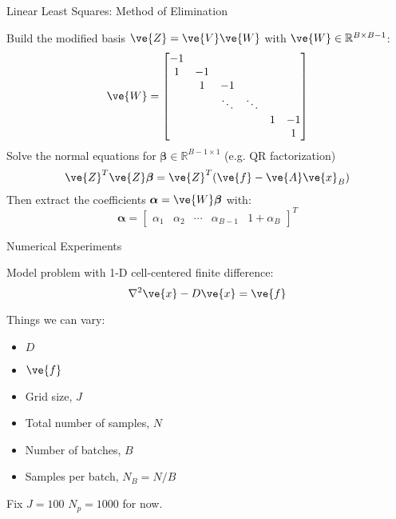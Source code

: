 \documentclass{beamer}
\begin{document}
\begin{frame}{Linear Least Squares: Method of Elimination}

  Build the modified basis $\ve{Z} = \ve{V}\ve{W}$ with $\ve{W} \in
  \mathbb{R}^{B \times B-1}$:
  \[
  \ve{W} =
  \begin{bmatrix}
    -1 &    & & & & \\
     1 & -1 & & & & \\
       &  1 & -1 & & & \\
       &    & \ddots   & \ddots &  & \\
     & & & & 1 & -1 \\
    & & & & & 1 \\
  \end{bmatrix}
  \]
  Solve the normal equations for $\boldsymbol{\beta} \in
  \mathbb{R}^{B-1 \times 1}$ (e.g. QR factorization)
  \[
  \ve{Z}^T \ve{Z} \boldsymbol{\beta} = \ve{Z}^T ( \ve{f} - \ve{A}\ve{x}_B
  )
  \]
  Then extract the coefficients $\boldsymbol{\alpha} =
  \ve{W}\boldsymbol{\beta}$ with:
  \[
  \boldsymbol{\alpha} =
  \begin{bmatrix}
    \alpha_1 & \alpha_2 & \cdots & \alpha_{B-1} & 1 + \alpha_{B}
  \end{bmatrix}^T
  \]

\end{frame}

\begin{frame}{Numerical Experiments}

  Model problem with 1-D cell-centered finite difference:
  \[
  \nabla^2 \ve{x} - D \ve{x} = \ve{f}
  \]

  Things we can vary:
  \begin{itemize}
    \item $D$
    \item $\ve{f}$
    \item Grid size, $J$
    \item Total number of samples, $N$
    \item Number of batches, $B$
    \item Samples per batch, $N_B = N/B$
  \end{itemize}
  
  Fix $J=100$ $N_p=1000$ for now.

\end{frame}
\end{document}
